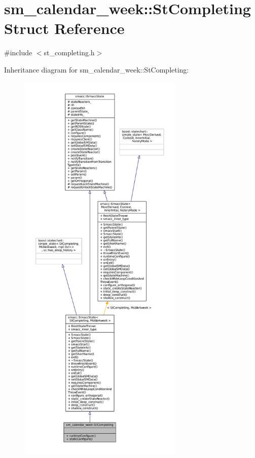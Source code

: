\hypertarget{structsm__calendar__week_1_1StCompleting}{}\section{sm\+\_\+calendar\+\_\+week\+:\+:St\+Completing Struct Reference}
\label{structsm__calendar__week_1_1StCompleting}


{\ttfamily \#include $<$st\+\_\+completing.\+h$>$}



Inheritance diagram for sm\+\_\+calendar\+\_\+week\+:\+:St\+Completing\+:
\nopagebreak
\begin{figure}[H]
\begin{center}
\leavevmode
\includegraphics[height=550pt]{structsm__calendar__week_1_1StCompleting__inherit__graph}
\end{center}
\end{figure}


